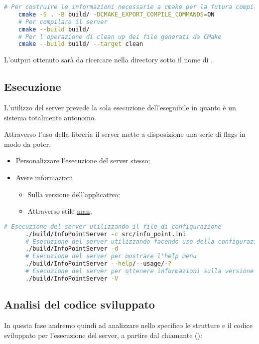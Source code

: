   \begin{lstlisting}[language=bash]
    # Per costruire le informazioni necessarie a cmake per la futura compilazione
    cmake -S . -B build/ -DCMAKE_EXPORT_COMPILE_COMMANDS=ON
    # Per compilare il server
    cmake --build build/
    # Per l'operazione di clean up dei file generati da CMake
    cmake --build build/ --target clean
  \end{lstlisting}

  L'output ottenuto sarà da ricercare nella directory  sotto il nome di  \footnotemark {}.

  \subsection{Esecuzione}
    L'utilizzo del server prevede la sola esecuzione dell'eseguibile in quanto è un sistema totalmente autonomo.

    Attraverso l'uso della libreria  il server mette a disposizione una serie di flags in modo da poter:

    \begin{itemize}
     \item Personalizzare l'esecuzione del server stesso;
     \item Avere informazioni
       \begin{itemize}
         \item Sulla versione dell'applicativo;
         \item Attraverso  stile \href{https://en.wikipedia.org/wiki/Man_page}{man};
       \end{itemize}
    \end{itemize}

    \begin{lstlisting}[language=bash]
      # Esecuzione del server utilizzando il file di configurazione
      ./build/InfoPointServer -c src/info_point.ini
      # Esecuzione del server utilizzando facendo uso della configurazione di default (-d o -use-default-config)
      ./build/InfoPointServer -d
      # Esecuzione del server per mostrare l'help menu
      ./build/InfoPointServer --help/--usage/-?
      # Esecuzione del server per ottenere informazioni sulla versione del server
      ./build/InfoPointServer -V
    \end{lstlisting}

  \subsection{Analisi del codice sviluppato}
  In questa fase andremo quindi ad analizzare nello specifico le strutture e il codice sviluppato per l'esecuzione del server, a partire dal chiamante ():

